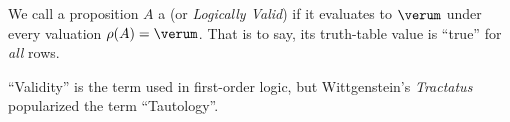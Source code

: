 \begin{definition}\label{prop-000L}%
We call a proposition $A$ a  (or \textit{Logically Valid})
if it evaluates to $\verum$ under every valuation $\rho(A)=\verum$.
That is to say, its truth-table value is ``true'' for \emph{all} rows.

``Validity'' is the term used in first-order logic, but Wittgenstein's
\textit{Tractatus} popularized the term ``Tautology''.
\end{definition}